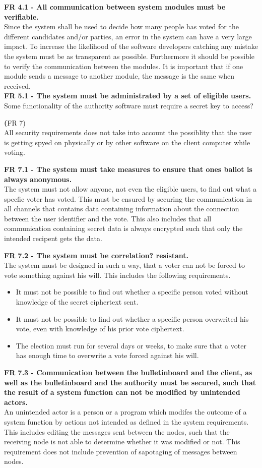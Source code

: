 \textbf{FR 4.1 - All communication between system modules must be verifiable.} \\
Since the system shall be used to decide how many people has voted for the different candidates and/or parties, an error in the system can have a very large impact. To increase the likelihood of the software developers catching any mistake the system must be as transparent as possible. Furthermore it should be possible to verify the communication between the modules. It is important that if one module sends a message to another module, the message is the same when received. \\

\textbf{ FR 5.1 - The system must be administrated by a set of eligible users.} \\
Some functionality of the authority software must require a secret key to access?

\textbf(FR 7)\\
All security requirements does not take into account the possiblity that the user is getting spyed on physically or by other software on the client computer while voting.

\textbf{FR 7.1 - The system must take measures to ensure that ones ballot is always anonymous.} \\
The system must not allow anyone, not even the eligible users, to find out what a specfic voter has voted. This must be ensured by securing the communication in all channels that contains data containing information about the connection between the user identifier and the vote. This also includes that all communication containing secret data is always encrypted such that only the intended recipent gets the data.

\textbf{FR 7.2 - The system must be correlation? resistant.} \\
The system must be designed in such a way, that a voter can not be forced to vote something against his will. This includes the following requirements.
\begin{itemize}
\item It must not be possible to find out whether a specific person voted without knowledge of the secret ciphertext sent.
\item It must not be possible to find out whether a specific person overwrited his vote, even with knowledge of his prior vote ciphertext.
\item The election must run for several days or weeks, to make sure that a voter has enough time to overwrite a vote forced against his will.
\end{itemize}

\textbf{FR 7.3 - Communication between the bulletinboard and the client, as well as the bulletinboard and the authority must be secured, such that the result of a system function can not be modified by unintended actors.} \\
An unintended actor is a person or a program which modifes the outcome of a system function by actions not intended as defined in the system requirements. This includes editing the messages sent between the nodes, such that the receiving node is not able to determine whether it was modified or not. This requirement does not include prevention of sapotaging of messages between nodes.
